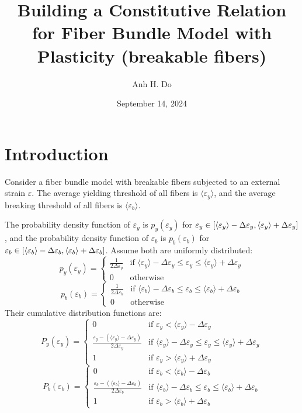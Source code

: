 \documentclass{article}
\newcommand{\eps}{\varepsilon}
\newcommand{\avg}[1]{\langle #1 \rangle}
\newcommand{\dey}{\Delta \varepsilon_y}
\newcommand{\deb}{\Delta \varepsilon_b}
\begin{document}
\title{Building a Constitutive Relation for Fiber Bundle Model with Plasticity (breakable fibers)}
\author{Anh H. Do}
\date{September 14, 2024}

\maketitle

\section{Introduction}

\indent 
Consider a fiber bundle model with breakable fibers subjected to an external strain $\eps$. The average yielding threshold of all fibers is $\avg{\eps_y}$, and the average breaking threshold of all fibers is $\avg{\eps_b}$. 

The probability density function of $\eps_y$ is $p_y(\eps_y)$ for $\eps_y \in \interval{\avg{\eps_y} - \dey}{\avg{\eps_y} + \dey}$ , and the probability density function of $\eps_b$ is $p_b(\eps_b)$ for $\eps_b \in \interval{\avg{\eps_b} - \deb}{\avg{\eps_b} + \deb}$. Assume both are uniformly distributed:
\begin{equation}
p_y(\eps_y) =
    \begin{cases} 
        \frac{1}{2 \dey} & \text{if } \avg{\eps_y} - \dey \leq \eps_y \leq \avg{\eps_y} + \dey \\
        0 & \text{otherwise}
    \end{cases}
\label{yielding_pdf}
\end{equation}
\begin{equation}
p_b(\eps_b) =
    \begin{cases} 
        \frac{1}{2 \deb} & \text{if } \avg{\eps_b} - \deb \leq \eps_b \leq \avg{\eps_b} + \deb \\
        0 & \text{otherwise}
    \end{cases}
\label{breaking_pdf}
\end{equation}  
Their cumulative distribution functions are:
\begin{equation}
P_y(\eps_y) = 
    \begin{cases} 
        0 & \text{if } \eps_y < \avg{\eps_y} - \dey \\
        \frac{\eps_y - (\avg{\eps_y} - \dey)}{2 \dey}& \text{if } \avg{\eps_y} - \dey \leq \eps_y \leq \avg{\eps_y} + \dey \\
        1 & \text{if } \eps_y > \avg{\eps_y} + \dey
    \end{cases}
\label{yielding_cdf}
\end{equation}
\begin{equation}
P_b(\eps_b) = 
    \begin{cases} 
        0 & \text{if } \eps_b < \avg{\eps_b} - \deb \\
        \frac{\eps_b - (\avg{\eps_b} - \deb)}{2 \deb}& \text{if } \avg{\eps_b} - \deb \leq \eps_b \leq \avg{\eps_b} + \deb \\
        1 & \text{if } \eps_b > \avg{\eps_b} + \deb
    \end{cases}
\label{breaking_cdf}
\end{equation}
\end{document}
